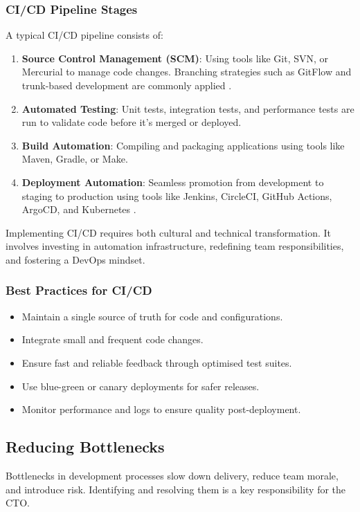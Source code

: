 \subsubsection*{CI/CD Pipeline Stages}
A typical CI/CD pipeline consists of:
\begin{enumerate}
    \item \textbf{Source Control Management (SCM)}: Using tools like Git, SVN, or Mercurial to manage code changes. Branching strategies such as GitFlow and trunk-based development are commonly applied \cite{chacon2014progit}.
    \item \textbf{Automated Testing}: Unit tests, integration tests, and performance tests are run to validate code before it's merged or deployed.
    \item \textbf{Build Automation}: Compiling and packaging applications using tools like Maven, Gradle, or Make.
    \item \textbf{Deployment Automation}: Seamless promotion from development to staging to production using tools like Jenkins, CircleCI, GitHub Actions, ArgoCD, and Kubernetes \cite{fowler2006ci}.
\end{enumerate}

Implementing CI/CD requires both cultural and technical transformation. It involves investing in automation infrastructure, redefining team responsibilities, and fostering a DevOps mindset.

\subsubsection*{Best Practices for CI/CD}
\begin{itemize}
    \item Maintain a single source of truth for code and configurations.
    \item Integrate small and frequent code changes.
    \item Ensure fast and reliable feedback through optimised test suites.
    \item Use blue-green or canary deployments for safer releases.
    \item Monitor performance and logs to ensure quality post-deployment.
\end{itemize}


\subsection{Reducing Bottlenecks}
Bottlenecks in development processes slow down delivery, reduce team morale, and introduce risk. Identifying and resolving them is a key responsibility for the CTO.

